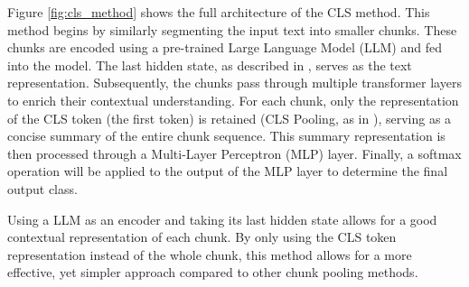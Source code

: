 Figure \ref{fig:cls_method} shows the full architecture of the CLS method.
This method begins by similarly segmenting the input text into smaller chunks. These chunks are encoded using a pre-trained Large Language Model (LLM) and fed into the model. The last hidden state, as described in \cite{sun-2020-fine-tune}, serves as the text representation. Subsequently, the chunks pass through multiple transformer layers to enrich their contextual understanding. For each chunk, only the representation of the CLS token (the first token) is retained (CLS Pooling, as in \cite{su-2021-classifying}), serving as a concise summary of the entire chunk sequence. This summary representation is then processed through a Multi-Layer Perceptron (MLP) layer. Finally, a softmax operation will be applied to the output of the MLP layer to determine the final output class.

Using a LLM as an encoder and taking its last hidden state allows for a good contextual representation of each chunk. By only using the CLS token representation instead of the whole chunk, this method allows for a more effective, yet simpler approach compared to other chunk pooling methods.

\begin{comment}
The complexity of the CLS method can be expressed as:
\[
    O(L \cdot TF \cdot T \cdot H_{\text{enc}}^2 \cdot M \cdot H_{\text{mlp}}^2)
\]

where:
\begin{align*}
    L              & : \text{Sequence length (number of tokens)}, \\
    T              & : \text{Number of transformer layers},       \\
    H_{\text{enc}} & : \text{Hidden size of transformer layers},  \\
    M              & : \text{Number of layers in the MLP},        \\
    H_{\text{mlp}} & : \text{Hidden size of the MLP}.             \\
\end{align*}
\end{comment}


